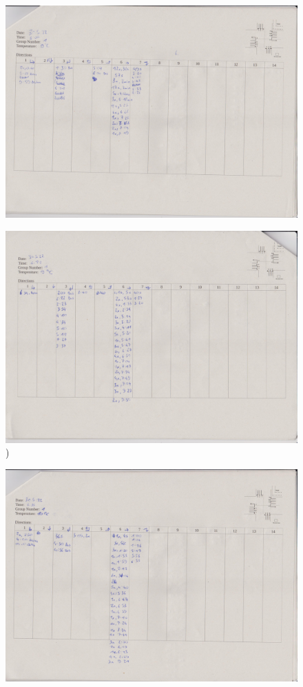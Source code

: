 \begin{figure}[htbp]
  \includegraphics[width=\linewidth]{scans/Bild (1).jpg}
\end{figure}

\begin{figure}[htbp]
  \includegraphics[width=\linewidth]{scans/Bild (2).jpg})
\end{figure}

\begin{figure}[htbp]
  \includegraphics[width=\linewidth]{scans/Bild (3).jpg}
\end{figure}

